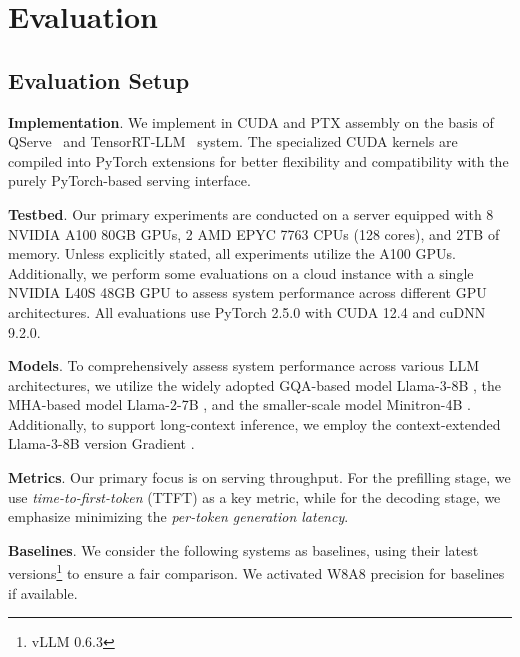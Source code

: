 \section{Evaluation}
\label{sect:results}




\subsection{Evaluation Setup}

\textbf{Implementation}. We implement \system in CUDA and PTX assembly on the basis of QServe~\cite{lin2024qserve} and TensorRT-LLM~\cite{trtllm} system. The specialized CUDA kernels are compiled into PyTorch extensions for better flexibility and compatibility with the purely PyTorch-based serving interface. 


\textbf{Testbed}. 
Our primary experiments are conducted on a server equipped with 8 NVIDIA A100 80GB GPUs, 2 AMD EPYC 7763 CPUs (128 cores), and 2TB of memory. Unless explicitly stated, all experiments utilize the A100 GPUs. Additionally, we perform some evaluations on a cloud instance with a single NVIDIA L40S 48GB GPU to assess system performance across different GPU architectures. All evaluations use PyTorch 2.5.0 with CUDA 12.4 and cuDNN 9.2.0.






\textbf{Models}. 
To comprehensively assess system performance across various LLM architectures, we utilize the widely adopted GQA-based model Llama-3-8B \cite{dubey2024llama}, the MHA-based model Llama-2-7B \cite{touvron2023llama2}, and the smaller-scale model Minitron-4B \cite{Minitron}. Additionally, to support long-context inference, we employ the context-extended Llama-3-8B version Gradient \cite{gradientlongcontextllama3}.


\textbf{Metrics}.
Our primary focus is on serving throughput. For the prefilling stage, we use \emph{time-to-first-token} (TTFT) as a key metric, while for the decoding stage, we emphasize minimizing the \emph{per-token generation latency}.



\textbf{Baselines}. 
We consider the following systems as baselines, using their latest versions\footnote{vLLM 0.6.3} to ensure a fair comparison. We activated W8A8 precision for baselines if available.


